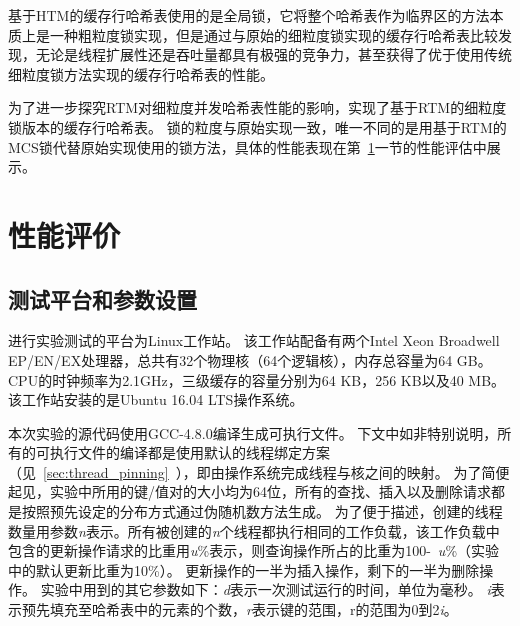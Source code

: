 基于HTM的缓存行哈希表使用的是全局锁，它将整个哈希表作为临界区的方法本质上是一种粗粒度锁实现，但是通过与原始的细粒度锁实现的缓存行哈希表比较发现，无论是线程扩展性还是吞吐量都具有极强的竞争力，甚至获得了优于使用传统细粒度锁方法实现的缓存行哈希表的性能。

为了进一步探究RTM对细粒度并发哈希表性能的影响，实现了基于RTM的细粒度锁版本的缓存行哈希表。
锁的粒度与原始实现一致，唯一不同的是用基于RTM的MCS锁代替原始实现使用的锁方法，具体的性能表现在第~\ref{sec:rtm-eva}一节的性能评估中展示。


\section{性能评价}
\label{sec:rtm-eva}
\subsection{测试平台和参数设置}
进行实验测试的平台为Linux工作站。
该工作站配备有两个Intel Xeon Broadwell EP/EN/EX处理器，总共有32个物理核（64个逻辑核），内存总容量为64 GB。
CPU的时钟频率为2.1GHz，三级缓存的容量分别为64 KB，256 KB以及40 MB。
该工作站安装的是Ubuntu 16.04 LTS操作系统。

本次实验的源代码使用GCC-4.8.0编译生成可执行文件。
下文中如非特别说明，所有的可执行文件的编译都是使用默认的线程绑定方案（见~\ref{sec:thread_pinning}~），即由操作系统完成线程与核之间的映射。
为了简便起见，实验中所用的键/值对的大小均为64位，所有的查找、插入以及删除请求都是按照预先设定的分布方式通过伪随机数方法生成。
为了便于描述，创建的线程数量用参数\textit{n}表示。所有被创建的\textit{n}个线程都执行相同的工作负载，该工作负载中包含的更新操作请求的比重用\textit{u}\%表示，则查询操作所占的比重为100-~\textit{u}\%（实验中的默认更新比重为10\%）。
更新操作的一半为插入操作，剩下的一半为删除操作。
实验中用到的其它参数如下：\textit{d}表示一次测试运行的时间，单位为毫秒。
\textit{i}表示预先填充至哈希表中的元素的个数，\textit{r}表示键的范围，r的范围为0到2\textit{i}。

